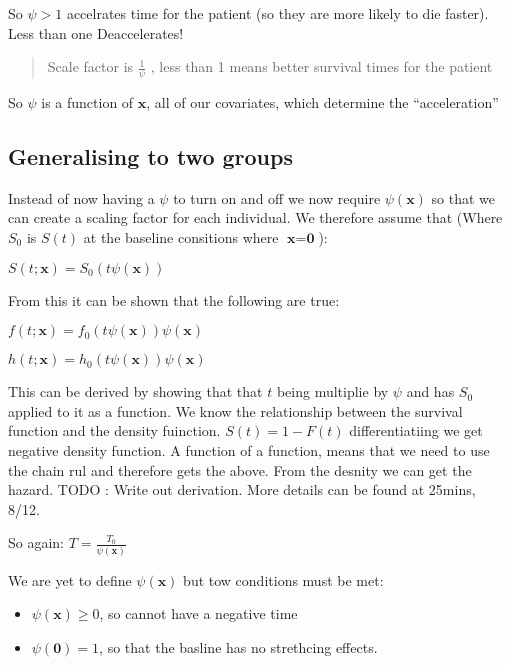 \documentclass[
  letterpaper,
  DIV=11,
  numbers=noendperiod]{scrreprt}
\providecommand{\tightlist}{%
  \setlength{\itemsep}{0pt}\setlength{\parskip}{0pt}}\usepackage{longtable,booktabs,array}
\begin{document}
So \(\psi >1\) accelrates time for the patient (so they are more likely
to die faster). Less than one Deaccelerates!

\begin{quote}
Scale factor is \(\frac{1}{\psi}\) , less than 1 means better survival
times for the patient
\end{quote}

So \(\psi\) is a function of \(\textbf{x}\), all of our covariates,
which determine the ``acceleration''

\hypertarget{generalising-to-two-groups}{%
\subsection{Generalising to two
groups}\label{generalising-to-two-groups}}

Instead of now having a \(\psi\) to turn on and off we now require
\(\psi(\textbf{x})\) so that we can create a scaling factor for each
individual. We therefore assume that (Where \(S_0\) is \(S(t)\) at the
baseline consitions where \(\textbf{x} = \textbf{0}\)):

\(S(t;\textbf{x}) = S_0(t\psi(\textbf{x}))\)

From this it can be shown that the following are true:

\(f(t;\textbf{x}) = f_0(t\psi(\textbf{x}))\psi(\textbf{x})\)

\(h(t;\textbf{x}) = h_0(t\psi(\textbf{x}))\psi(\textbf{x})\)

This can be derived by showing that that \(t\) being multiplie by
\(\psi\) and has \(S_0\) applied to it as a function. We know the
relationship between the survival function and the density fuinction.
\(S(t) = 1- F(t)\) differentiatiing we get negative density function. A
function of a function, means that we need to use the chain rul and
therefore gets the above. From the desnity we can get the hazard. TODO :
Write out derivation. More details can be found at 25mins, 8/12.

So again: \(T = \frac{T_0}{\psi(\textbf{x})}\)

We are yet to define \(\psi(\textbf{x})\) but tow conditions must be
met:

\begin{itemize}
\tightlist
\item
  \(\psi(\textbf{x})\geq 0\), so cannot have a negative time
\item
  \(\psi(\textbf{0}) = 1\), so that the basline has no strethcing
  effects.
\end{itemize}
\end{document}
